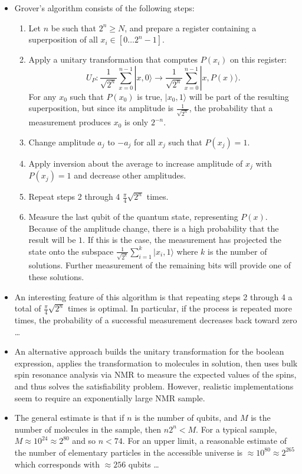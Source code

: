 \documentclass{article}
\def\pagedone{\newpage}
\def\ket#1{|{#1}\rangle}
\begin{document}
\begin{itemize}
\item Grover's algorithm consists of the following steps:
\begin{enumerate}
\item Let $n$ be such that $2^n \geq N$, and prepare a register containing a superposition of all $x_i\in [0\dots 2^n-1]$.
\item Apply a unitary transformation that computes $P(x_i)$ on this register:
$$U_P: \frac{1}{\sqrt{2^n}}\sum_{x=0}^{n-1}\ket{x, 0} \to 
	\frac{1}{\sqrt{2^n}}\sum_{x=0}^{n-1}\ket{x, P(x)}.$$
	For any $x_0$ such that $P(x_0)$ is true, $\ket{x_0, 1}$ will be part of the 
resulting superposition, but since its 
amplitude is $\frac{1}{\sqrt{2^n}}$, 
the probability that a measurement produces $x_0$ is only $2^{-n}$. 
\item Change amplitude $a_j$ to $-a_j$ for all $x_j$ such that $P(x_j)=1$.
\item Apply inversion about the average to increase 
amplitude of $x_j$ with $P(x_j)=1$ and decrease other amplitudes. 
\item Repeat steps 2 through 4 $\frac{\pi}{4}\sqrt{2^n}$ times.
\item Measure the last qubit of the quantum state, representing $P(x)$.  
Because of the amplitude 
change, there is a high probability that the result will be $1$.  If this is the
case, the measurement has projected the state
onto the subspace $\frac{1}{\sqrt{2^k}}\sum_{i=1}^{k}\ket{x_i, 1}$ where $k$ is the 
number of solutions.  Further measurement of the remaining bits will provide one of these solutions.
\end{enumerate}
\item An interesting feature of this algorithm is that repeating steps 2 through 4 a total of $\frac{\pi}{4}\sqrt{2^n}$ times is optimal.  In particular, if the process is repeated more times, the probability of a successful measurement decreases back toward zero \ldots
\pagedone

\item An alternative approach builds the unitary transformation for the boolean expression, applies the transformation to molecules in solution, then uses bulk spin resonance analysis via NMR to measure the expected values of the spins, and thus solves the satisfiability problem.  However, realistic implementations seem to require an exponentially large NMR sample. 
\item The general estimate is that if $n$ is the number of qubits, and $M$ is the number of molecules in the sample, then $n2^n < M$.  For a typical sample, $M \approx 10^{24} \approx 2^{80}$ and so $n < 74$.  For an upper limit, a reasonable estimate of the number of elementary particles in the accessible universe is $\approx 10^{80} \approx 2^{265}$ which corresponds with $\approx 256$ qubits \ldots
\end{itemize}
\pagedone
%
\end{document}
